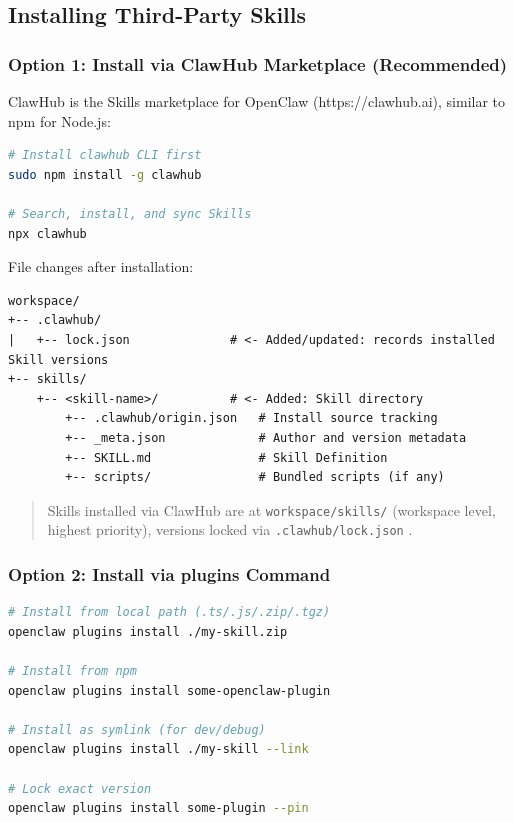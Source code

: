 \subsection{Installing Third-Party Skills}


\subsubsection{Option 1: Install via ClawHub Marketplace (Recommended)}


ClawHub is the Skills marketplace for OpenClaw (https://clawhub.ai), similar to npm for Node.js:

\begin{lstlisting}[language=bash]
# Install clawhub CLI first
sudo npm install -g clawhub

# Search, install, and sync Skills
npx clawhub
\end{lstlisting}

File changes after installation:

\begin{lstlisting}
workspace/
+-- .clawhub/
|   +-- lock.json              # <- Added/updated: records installed Skill versions
+-- skills/
    +-- <skill-name>/          # <- Added: Skill directory
        +-- .clawhub/origin.json   # Install source tracking
        +-- _meta.json             # Author and version metadata
        +-- SKILL.md               # Skill Definition
        +-- scripts/               # Bundled scripts (if any)
\end{lstlisting}

\begin{quote}
Skills installed via ClawHub are at \texttt{workspace/skills/}  (workspace level, highest priority), versions locked via \texttt{.clawhub/lock.json} .
\end{quote}

\subsubsection{Option 2: Install via plugins Command}


\begin{lstlisting}[language=bash]
# Install from local path (.ts/.js/.zip/.tgz)
openclaw plugins install ./my-skill.zip

# Install from npm
openclaw plugins install some-openclaw-plugin

# Install as symlink (for dev/debug)
openclaw plugins install ./my-skill --link

# Lock exact version
openclaw plugins install some-plugin --pin
\end{lstlisting}

